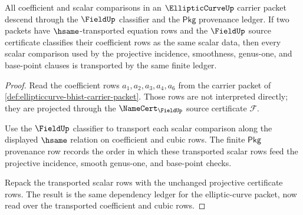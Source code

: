 \begin{theorem}\label{thm:ellipticcurve-field-dependency-ledger-obligation}
All coefficient and scalar comparisons in an $\EllipticCurveUp$ carrier packet descend through the $\FieldUp$ classifier and the $\mathsf{Pkg}$ provenance ledger. If two packets have $\hsame$-transported equation rows and the $\FieldUp$ source certificate classifies their coefficient rows as the same scalar data, then every scalar comparison used by the projective incidence, smoothness, genus-one, and base-point clauses is transported by the same finite ledger.
\end{theorem}
\begin{proof}
Read the coefficient rows $a_1,a_2,a_3,a_4,a_6$ from the carrier packet of \autoref{def:ellipticcurve-bhist-carrier-packet}. Those rows are not interpreted directly; they are projected through the $\NameCert_{\FieldUp}$ source certificate $\mathcal{F}$.

Use the $\FieldUp$ classifier to transport each scalar comparison along the displayed $\hsame$ relation on coefficient and cubic rows. The finite $\mathsf{Pkg}$ provenance row records the order in which these transported scalar rows feed the projective incidence, smooth genus-one, and base-point checks.

Repack the transported scalar rows with the unchanged projective certificate rows. The result is the same dependency ledger for the elliptic-curve packet, now read over the transported coefficient and cubic rows.
\end{proof}

